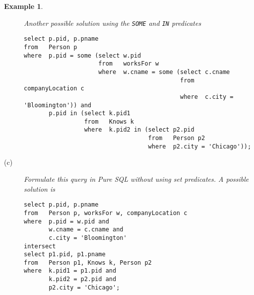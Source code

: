 \documentclass[11pt]{article}
\newtheorem{example}{Example}
\begin{document}
\begin{example}
\begin{description}
Another possible solution using the {\tt SOME} and {\tt IN} predicates
{\footnotesize
\begin{verbatim}
select p.pid, p.pname
from   Person p
where  p.pid = some (select w.pid
                     from   worksFor w
                     where  w.cname = some (select c.cname
                                            from   companyLocation c
                                            where  c.city = 'Bloomington')) and
       p.pid in (select k.pid1
                 from   Knows k
                 where  k.pid2 in (select p2.pid
                                   from   Person p2
                                   where  p2.city = 'Chicago'));
\end{verbatim}
}

\item[(c)]   Formulate this query in Pure SQL without using set predicates.
A possible solution is
{\footnotesize
\begin{verbatim}
select p.pid, p.pname
from   Person p, worksFor w, companyLocation c
where  p.pid = w.pid and
       w.cname = c.cname and
       c.city = 'Bloomington'
intersect
select p1.pid, p1.pname
from   Person p1, Knows k, Person p2
where  k.pid1 = p1.pid and
       k.pid2 = p2.pid and
       p2.city = 'Chicago';
\end{verbatim}}

\end{description}
\end{example}
\end{document}
